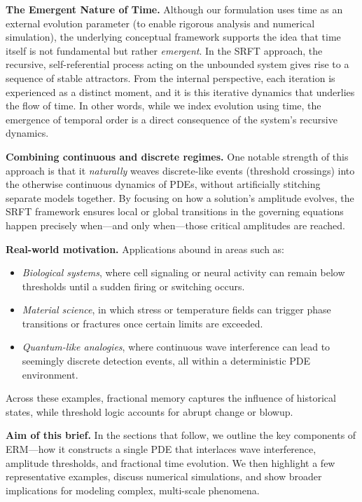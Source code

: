 \documentclass[12pt]{article}
\begin{document}
\medskip

\noindent
\textbf{The Emergent Nature of Time.}  
Although our formulation uses time as an external evolution parameter (to enable rigorous analysis and numerical simulation), the underlying conceptual framework supports the idea that time itself is not fundamental but rather \emph{emergent}. In the SRFT approach, the recursive, self-referential process acting on the unbounded system gives rise to a sequence of stable attractors. From the internal perspective, each iteration is experienced as a distinct moment, and it is this iterative dynamics that underlies the flow of time. In other words, while we index evolution using time, the emergence of temporal order is a direct consequence of the system’s recursive dynamics.

\medskip

\noindent
\textbf{Combining continuous and discrete regimes.}  
One notable strength of this approach is that it \emph{naturally} weaves 
discrete-like events (threshold crossings) into the otherwise continuous dynamics 
of PDEs, without artificially stitching separate models together. By focusing on 
how a solution’s amplitude evolves, the SRFT framework ensures local or global 
transitions in the governing equations happen precisely when—and only when—those 
critical amplitudes are reached.

\medskip

\noindent
\textbf{Real-world motivation.}  
Applications abound in areas such as:
\begin{itemize}
    \item \emph{Biological systems}, where cell signaling or neural activity 
          can remain below thresholds until a sudden firing or switching occurs.
    \item \emph{Material science}, in which stress or temperature fields 
          can trigger phase transitions or fractures once certain limits are exceeded.
    \item \emph{Quantum-like analogies}, where continuous wave interference 
          can lead to seemingly discrete detection events, all within a 
          deterministic PDE environment.
\end{itemize}
Across these examples, fractional memory captures the influence of historical states, 
while threshold logic accounts for abrupt change or blowup.

\medskip

\noindent
\textbf{Aim of this brief.}  
In the sections that follow, we outline the key components of ERM—how it constructs 
a single PDE that interlaces wave interference, amplitude thresholds, and fractional 
time evolution. We then highlight a few representative examples, discuss numerical 
simulations, and show broader implications for modeling complex, multi-scale phenomena.
\end{document}
